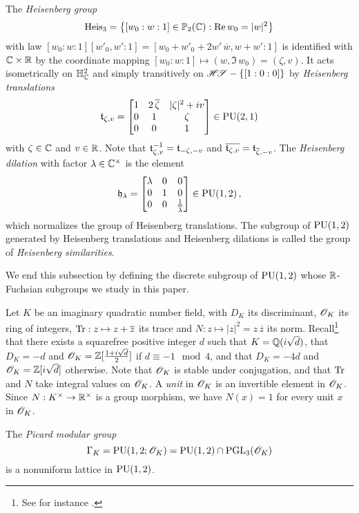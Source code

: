 \documentclass[11pt]{article}
\begin{document}
The
{\em Heisenberg group}
$$
\operatorname{Heis}_3=\big\{[w_0:w:1]\in{\mathbb P}_2({\mathbb C}):{\operatorname{Re}}\, w_0=|w|^2\big\} 
$$ 
with law $[w_0:w:1][w'_0,w':1]= [w_0+w'_0+2w'\,\overline{w},
  w+w':1]$ is identified with ${\mathbb C}\times{\mathbb R}$ by the coordinate mapping
$[w_0:w:1]\mapsto(w,\Im\, w_0)=(\zeta,v)$.  It acts isometrically on
${{\mathbb H}}^2_{\mathbb C}$ and simply transitively on $\mathscr{H\!S}- \{[1:0:0]\}$ by {\em
  Heisenberg translations}
$$
{\mathfrak t}_{\zeta,v}=
\begin{bmatrix} 1 & 2\,{\overline{\zeta}} & |\zeta|^2+iv\\ 0 & 1 &
\zeta \\ 0 & 0 & 1\end{bmatrix}\in\operatorname{PU}(2,1)
$$ 
with $\zeta\in{\mathbb C}$ and $v\in{\mathbb R}$. Note that ${\mathfrak t}_{\zeta,v}^{-1}
={\mathfrak t}_{-\zeta,-v}$ and $\overline{{\mathfrak t}_{\zeta,v}}=
{\mathfrak t}_{\overline{\zeta},-v}$.  The {\it Heisenberg dilation} with
factor $\lambda\in{\mathbb C}^\times$ is the element 
$$
{\mathfrak h}_{\lambda}=\begin{bmatrix} \lambda & 0 & 0\\ 0 & 1 & 0 \\ 0
& 0 & \frac{1}{{\overline{\lambda}}}\end{bmatrix}\in\operatorname{PU}(1,2)\,,
$$
which normalizes the group of Heisenberg translations.
The subgroup of $\operatorname{PU}(1,2)$ generated by Heisenberg translations and
Heisenberg dilations is called the group of {\it Heisenberg
  similarities}.


We end this subsection by defining the discrete subgroup of $\operatorname{PU}(1,2)$
whose ${\mathbb R}$-Fuchsian subgroups we study in this paper.

Let $K$ be an imaginary quadratic number field, with $D_K$ its
discriminant, $\OOO_K$ its ring of integers, $\operatorname{Tr}:z\mapsto
z+\overline{z}$ its trace and $N:z\mapsto|z|^2=z\,\overline{z}$ its
norm.  Recall\footnote{See for instance \cite{Samuel67}.} that there
exists a squarefree positive integer $d$ such that $K={\mathbb Q}(i\sqrt{d})$,
that $D_K=-d$ and $\OOO_K=\ZZ[\frac{1+i\sqrt{d}}{2}]$ if $d\equiv
-1\mod 4$, and that $D_K=-4d$ and $\OOO_K=\ZZ[i\sqrt{d}]$
otherwise. Note that $\OOO_K$ is stable under conjugation, and that
$\operatorname{Tr}$ and $N$ take integral values on $\OOO_K$. A {\it unit} in
$\OOO_K$ is an invertible element in $\OOO_K$. Since
$N:K^\times\rightarrow{\mathbb R}^\times$ is a group morphism, we have $N(x)=1$ for
every unit $x$ in $\OOO_K$.

The {\em Picard modular group}
$$
\Ga_K=\PU(1,2;\OOO_K)=\PU(1,2)\cap \PGL_3(\OOO_K)
$$
is a nonuniform lattice in $\operatorname{PU}(1,2)$. 
\end{document}
